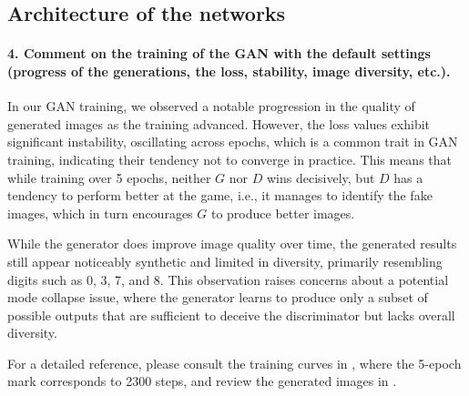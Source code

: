 \subsection{Architecture of the networks}

\paragraph*{4. Comment on the training of the GAN with the default settings (progress of the generations, the loss, stability, image diversity, etc.).}

In our GAN training, we observed a notable progression in the quality of generated images as the training advanced. However, the loss values exhibit significant instability, oscillating across epochs, which is a common trait in GAN training, indicating their tendency not to converge in practice. This means that while training over 5 epochs, neither $G$ nor $D$ wins decisively, but $D$ has a tendency to perform better at the game, i.e., it manages to identify the fake images, which in turn encourages $G$ to produce better images. 

While the generator does improve image quality over time, the generated results still appear noticeably synthetic and limited in diversity, primarily resembling digits such as 0, 3, 7, and 8. This observation raises concerns about a potential mode collapse issue, where the generator learns to produce only a subset of possible outputs that are sufficient to deceive the discriminator but lacks overall diversity.

For a detailed reference, please consult the training curves in , where the 5-epoch mark corresponds to 2300 steps, and review the generated images in .

